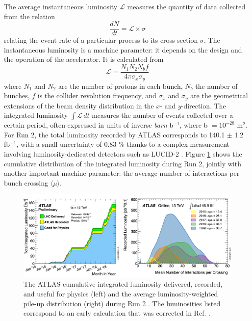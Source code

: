 The average instantaneous luminosity $\mathcal{L}$ measures the quantity of data collected from the relation
\begin{equation}
  \frac{dN}{dt} = \mathcal{L} \times \sigma
\end{equation}
relating the event rate of a particular process to its cross-section $\sigma$. The instantaneous luminosity is a machine parameter: it depends on the design and the operation of the accelerator. It is calculated from
\begin{equation}
  \mathcal{L} = \frac{N_1N_2N_bf}{4\pi\sigma_x\sigma_y}
\end{equation}
where $N_1$ and $N_2$ are the number of protons in each bunch, $N_b$ the number of bunches, $f$ is the collider revolution frequency, and $\sigma_x$ and $\sigma_y$ are the geometrical extensions of the beam density distribution in the $x$- and $y$-direction. The integrated luminosity $\int \mathcal{L}\, dt$ measures the number of events collected over a certain period, often expressed in units of inverse \textit{barn} b$^{-1}$, where b $= 10^{-28}$ m$^{2}$. For Run 2, the total luminosity recorded by ATLAS corresponds to 140.1 $\pm$ 1.2 fb$^{-1}$, with a small uncertainty of 0.83 \% \cite{ATLAS:2022hro} thanks to a complex measurement involving luminosity-dedicated detectors such as LUCID-2 \cite{Avoni_2018}. Figure \ref{fig-atlasLumiPileup} shows the cumulative distribution of the integrated luminosity during Run 2, jointly with another important machine parameter: the average number of interactions per bunch crossing $\langle \mu\rangle$.

\begin{figure}[!h]
  \centering
  \includegraphics[width=\textwidth]{Images/ATLAS/recoATLAS.png}
  \caption{The ATLAS cumulative integrated luminosity delivered, recorded, and useful for physics (left) and the average luminosity-weighted pile-up distribution (right) during Run 2  \cite{PubAtlasLumi}. The luminosities listed correspond to an early calculation that was corrected in Ref. \cite{ATLAS:2022hro}.}
  \label{fig-atlasLumiPileup}
\end{figure}

